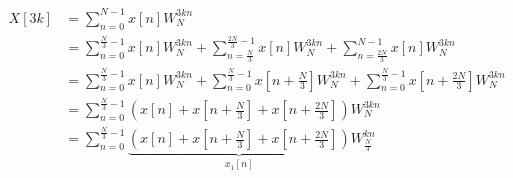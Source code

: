 \documentclass{article}
\begin{document}
\newpage
\section{}

\subsection{}

\begin{align}
    X[3k] &= \sum_{n = 0}^{N - 1} x[n] W_N^{3kn} \\
    &= \sum_{n = 0}^{\frac{N}{3} - 1} x[n] W_N^{3kn} + \sum_{n = \frac{N}{3}}^{\frac{2N}{3} - 1} x[n] W_N^{3kn} + \sum_{n = \frac{2N}{3}}^{N - 1} x[n] W_N^{3kn} \\
    &= \sum_{n = 0}^{\frac{N}{3} - 1} x[n] W_N^{3kn} + \sum_{n = 0}^{\frac{N}{3} - 1} x\left[n + \frac{N}{3}\right] W_N^{3kn} + \sum_{n = 0}^{\frac{N}{3} - 1} x\left[n + \frac{2N}{3}\right] W_N^{3kn} \\
    &= \sum_{n = 0}^{\frac{N}{3} - 1} \left(x[n] + x\left[n + \frac{N}{3}\right] + x\left[n + \frac{2N}{3}\right]\right) W_N^{3kn} \\
    &= \sum_{n = 0}^{\frac{N}{3} - 1} \underbrace{\left(x[n] + x\left[n + \frac{N}{3}\right] + x\left[n + \frac{2N}{3}\right]\right)}_{x_1[n]} W_{\frac{N}{3}}^{kn}
\end{align}

\subsection{}
\end{document}
